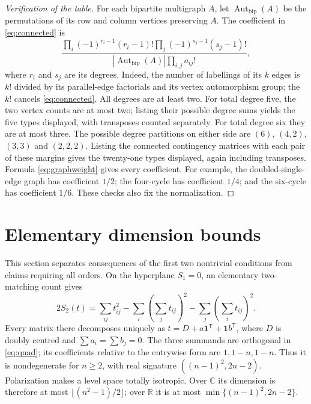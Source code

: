 \documentclass[11pt]{article}
\newcommand{\C}{\mathbb C}
\newcommand{\R}{\mathbb R}
\theoremstyle{definition}
\theoremstyle{remark}
\begin{document}
\begin{proof}[Verification of the table]
For each bipartite multigraph $A$, let $\operatorname{Aut}_{\mathrm{bip}}(A)$ be the permutations of its row and column vertices preserving $A$. The coefficient in \eqref{eq:connected} is
\begin{equation}\label{eq:graphweight}
 \frac{\prod_i(-1)^{r_i-1}(r_i-1)!
       \prod_j(-1)^{s_j-1}(s_j-1)!}
 {|\operatorname{Aut}_{\mathrm{bip}}(A)|\prod_{i,j}a_{ij}!},
\end{equation}
where $r_i$ and $s_j$ are its degrees. Indeed, the number of labellings of its $k$ edges is $k!$ divided by its parallel-edge factorials and its vertex automorphism group; the $k!$ cancels \eqref{eq:connected}.
All degrees are at least two. For total degree five, the two vertex counts are at most two; listing their possible degree sums yields the five types displayed, with transposes counted separately. For total degree six they are at most three. The possible degree partitions on either side are $(6)$, $(4,2)$, $(3,3)$ and $(2,2,2)$. Listing the connected contingency matrices with each pair of these margins gives the twenty-one types displayed, again including transposes. Formula \eqref{eq:graphweight} gives every coefficient. For example, the doubled-single-edge graph has coefficient $1/2$; the four-cycle has coefficient $1/4$; and the six-cycle has coefficient $1/6$. These checks also fix the normalization.
\end{proof}

\section{Elementary dimension bounds}
This section separates consequences of the first two nontrivial conditions from claims requiring all orders.
On the hyperplane $S_1=0$, an elementary two-matching count gives
\begin{equation}\label{eq:quad}
 2S_2(t)=\sum_{ij}t_{ij}^2-\sum_i\left(\sum_jt_{ij}\right)^2
                         -\sum_j\left(\sum_it_{ij}\right)^2.
\end{equation}
Every matrix there decomposes uniquely as
$t=D+a\mathbf1^{\mathsf T}+\mathbf1b^{\mathsf T}$,
where $D$ is doubly centred and $\sum a_i=\sum b_j=0$.
The three summands are orthogonal in \eqref{eq:quad}; its coefficients relative to the entrywise form are $1,1-n,1-n$. Thus it is nondegenerate for $n\geq2$, with real signature $((n-1)^2,2n-2)$.
Polarization makes a level space totally isotropic. Over $\C$ its dimension is therefore at most $\lfloor(n^2-1)/2\rfloor$; over $\R$ it is at most $\min\{(n-1)^2,2n-2\}$.
\end{document}
